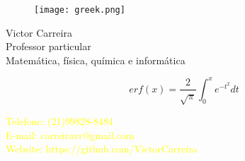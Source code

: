 \documentclass[10pt]{beamer} %
\begin{document}
{%

	\begin{frame}
		\begin{figure}
			\centering
			\texttt{[image: greek.png]}
		\end{figure}
        \begin{center}{Victor Carreira}
					\\
					Professor particular
					\\
					Matem\'atica, f\'isica, qu\'imica e inform\'atica
        \end{center}
         \vspace{1cm}    
				\begin{equation}
					erf(x)=\dfrac{2}{\sqrt{\pi}}\int^{x}_{0}e^{-t^{2}}dt \nonumber
				\end{equation}

        \vspace{1.5cm}
			  \begin{center}
				\textcolor{yellow}{Telefone: (21)99828-8484}
			 \\
			 \textcolor{yellow}{E-mail: carreiravr@gmail.com}
			 \\
			 \textcolor{yellow}{Website: https://github.com/VictorCarreira}

			\end{center}





	\end{frame}
}
\end{document}
